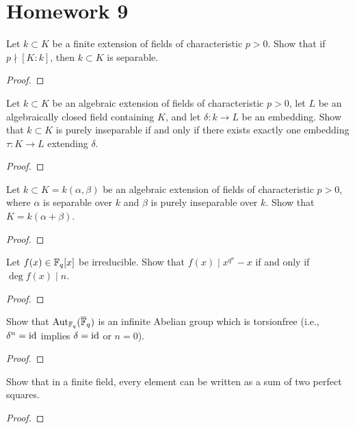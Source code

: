 \chapter{Homework 9}
\begin{problem}
Let $k\subset K$ be a finite extension of fields of characteristic
$p>0$. Show that if $p\nmid [K:k]$, then $k\subset K$ is separable.
\end{problem}
\begin{proof}
\end{proof}

\begin{problem}
Let $k\subset K$ be an algebraic extension of fields of characteristic
$p>0$, let $L$ be an algebraically closed field containing $K$, and let
$\delta\colon k\to L$ be an embedding. Show that $k\subset K$ is purely
inseparable if and only if there exists exactly one embedding $\tau\colon
K\to L$ extending $\delta$.
\end{problem}
\begin{proof}
\end{proof}

\begin{problem}
Let $k\subset K=k(\alpha,\beta)$ be an algebraic extension of fields of
characteristic $p>0$, where $\alpha$ is separable over $k$ and $\beta$ is
purely inseparable over $k$. Show that $K=k(\alpha+\beta)$.
\end{problem}
\begin{proof}
\end{proof}

\begin{problem}
Let $f(x)\in\mathbb{F}_q[x]$ be irreducible. Show that $f(x)\mid x^{q^n}-x$ if
and only if $\deg f(x)\mid n$.
\end{problem}
\begin{proof}
\end{proof}

\begin{problem}
Show that $\operatorname{Aut}_{\mathbb{F}_q}(\overline{\mathbb{F}}_q)$ is an infinite Abelian group
which is torsionfree (i.e., $\delta^n=\operatorname{id}$ implies $\delta=\operatorname{id}$ or $n=0$).
\end{problem}
\begin{proof}
\end{proof}

\begin{problem}
Show that in a finite field, every element can be written as a sum of two
perfect squares.
\end{problem}
\begin{proof}
\end{proof}

